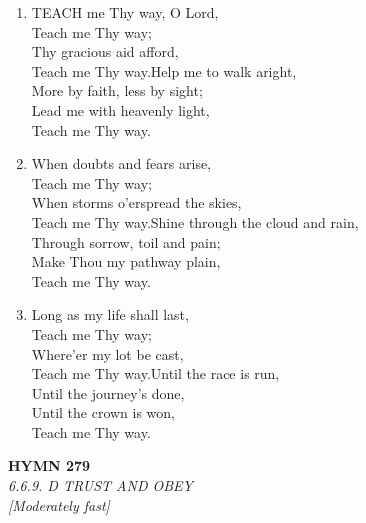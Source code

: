 \begin{enumerate}
    \item TEACH me Thy way, O Lord, \\
        Teach me Thy way; \\
        Thy gracious aid afford, \\
        Teach me Thy way.Help me to walk aright, \\
        More by faith, less by sight; \\
        Lead me with heavenly light, \\
        Teach me Thy way.

    \item When doubts and fears arise, \\
        Teach me Thy way; \\
        When storms o'erspread the skies, \\
        Teach me Thy way.Shine through the cloud and rain, \\
        Through sorrow, toil and pain; \\
        Make Thou my pathway plain, \\
        Teach me Thy way.

    \item Long as my life shall last, \\
        Teach me Thy way; \\
        Where'er my lot be cast, \\
        Teach me Thy way.Until the race is run, \\
        Until the journey's done, \\
        Until the crown is won, \\
        Teach me Thy way.

\end{enumerate}

\newpage
\begin{center}
    {\Large \textbf{HYMN 279}}
    \\
    \textit{6.6.9. D TRUST AND OBEY}
    \\
    \textit{\small [Moderately fast]}
\end{center}
\vspace{1em}

